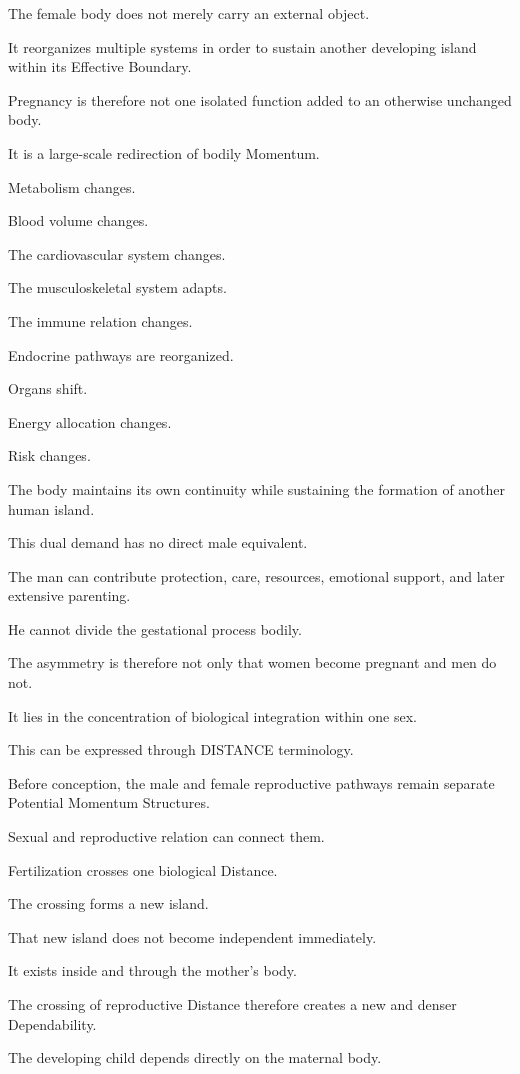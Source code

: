 The female body does not merely carry an external object.

It reorganizes multiple systems in order to sustain another developing island within its Effective Boundary.

Pregnancy is therefore not one isolated function added to an otherwise unchanged body.

It is a large-scale redirection of bodily Momentum.

Metabolism changes.

Blood volume changes.

The cardiovascular system changes.

The musculoskeletal system adapts.

The immune relation changes.

Endocrine pathways are reorganized.

Organs shift.

Energy allocation changes.

Risk changes.

The body maintains its own continuity while sustaining the formation of another human island.

This dual demand has no direct male equivalent.

The man can contribute protection, care, resources, emotional support, and later extensive parenting.

He cannot divide the gestational process bodily.

The asymmetry is therefore not only that women become pregnant and men do not.

It lies in the concentration of biological integration within one sex.

This can be expressed through DISTANCE terminology.

Before conception, the male and female reproductive pathways remain separate Potential Momentum Structures.

Sexual and reproductive relation can connect them.

Fertilization crosses one biological Distance.

The crossing forms a new island.

That new island does not become independent immediately.

It exists inside and through the mother’s body.

The crossing of reproductive Distance therefore creates a new and denser Dependability.

The developing child depends directly on the maternal body.

